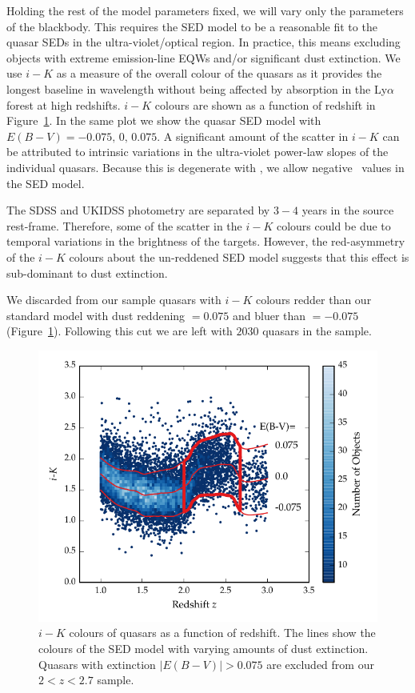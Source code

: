 Holding the rest of the model parameters fixed, we will vary only the parameters of the blackbody. 
This requires the SED model to be a reasonable fit to the quasar SEDs in the ultra-violet/optical region. 
In practice, this means excluding objects with extreme emission-line EQWs and/or significant dust extinction.
We use $i-K$ as a measure of the overall colour of the quasars as it provides the longest baseline in wavelength without being affected by absorption in the Ly$\alpha$ forest at high redshifts. 
$i-K$ colours are shown as a function of redshift in Figure~\ref{fig:ikzplot}.
In the same plot we show the quasar SED model with $E(B-V)=-0.075,\,0,\,0.075$. 
A significant amount of the scatter in $i-K$ can be attributed to intrinsic variations in the ultra-violet power-law slopes of the individual quasars.
Because this is degenerate with \ebv, we allow negative \ebv\, values in the SED model. 

The SDSS and UKIDSS photometry are separated by $3-4$ years in the source rest-frame. 
Therefore, some of the scatter in the $i-K$ colours could be due to temporal variations in the brightness of the targets. 
However, the red-asymmetry of the $i-K$ colours about the un-reddened SED model suggests that this effect is sub-dominant to dust extinction. 

We discarded from our sample quasars with $i - K$ colours redder than our standard model with dust reddening \ebv $= 0.075$ and bluer than \ebv $=-0.075$ (Figure~\ref{fig:ikzplot}). 
Following this cut we are left with $2030$ quasars in the sample. 

\begin{figure}[t!]
  \centering
  \includegraphics[width=\columnwidth]{figures/chapter05/ik_versus_z_low_ext.pdf}
  \caption[{$i-K$ colours of quasars as a function of redshift.}]{$i-K$ colours of quasars as a function of redshift. The lines show the colours of the SED model with varying amounts of dust extinction. Quasars with extinction $|E(B-V)|>0.075$ are excluded from our $2 < z < 2.7$ sample.}
  \label{fig:ikzplot}
\end{figure}

